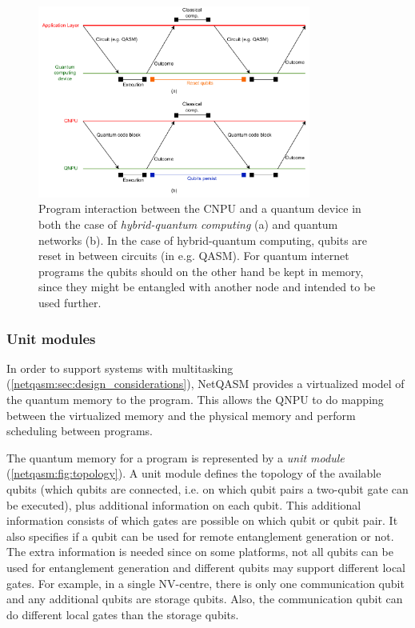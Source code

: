 \begin{figure}[t]
      \centering
      \includegraphics[width=0.8\textwidth]{figures/netqasm/classical-quantum-interaction.pdf}
      \caption{Program interaction between the \ac{CNPU} and a quantum device in
            both the case of \emph{hybrid-quantum computing} (a)
            and quantum networks (b). In the case of hybrid-quantum
            computing, qubits are reset in between circuits (in e.g. QASM). For
            quantum internet programs the qubits should on the other hand be
            kept in memory, since they might be entangled with another node and
            intended to be used further.}
      \label{netqasm:fig:hybrid}
\end{figure}

\subsubsection{Unit modules}
In order to support systems with multitasking (\cref{netqasm:sec:design_considerations}), \ac{NetQASM} provides a virtualized model of the quantum memory to the program.
This allows the \ac{QNPU} to do mapping between the virtualized memory and the physical memory and perform scheduling between programs.

The quantum memory for a program is represented by a \textit{unit module} (\cref{netqasm:fig:topology}).
A unit module defines the topology of the available qubits (which qubits are connected, i.e. on which qubit pairs a two-qubit gate can be executed), plus additional information on each qubit.
This additional information consists of which gates are possible on which qubit or qubit pair.
It also specifies if a qubit can be used for remote entanglement generation or not.
The extra information is needed since on some platforms, not all qubits can be used for entanglement generation and different qubits may support different local gates.
For example, in a single NV-centre, there is only one communication qubit and any additional qubits are storage qubits.
Also, the communication qubit can do different local gates than the storage qubits.

